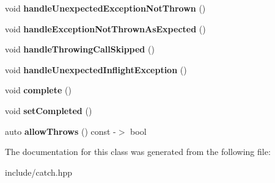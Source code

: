 \begin{DoxyCompactItemize}
\item 
void {\bfseries handle\+Unexpected\+Exception\+Not\+Thrown} ()\hypertarget{classCatch_1_1AssertionHandler_a7764d0adb6ed5eeb10964f6abc02fab1}{}\label{classCatch_1_1AssertionHandler_a7764d0adb6ed5eeb10964f6abc02fab1}

\item 
void {\bfseries handle\+Exception\+Not\+Thrown\+As\+Expected} ()\hypertarget{classCatch_1_1AssertionHandler_a51e4936e3af43b74690cedae6d2e297a}{}\label{classCatch_1_1AssertionHandler_a51e4936e3af43b74690cedae6d2e297a}

\item 
void {\bfseries handle\+Throwing\+Call\+Skipped} ()\hypertarget{classCatch_1_1AssertionHandler_a67a194d5518f307c4a16faa03a7f7442}{}\label{classCatch_1_1AssertionHandler_a67a194d5518f307c4a16faa03a7f7442}

\item 
void {\bfseries handle\+Unexpected\+Inflight\+Exception} ()\hypertarget{classCatch_1_1AssertionHandler_aa2504dad6a91f3645e5f52c932c11270}{}\label{classCatch_1_1AssertionHandler_aa2504dad6a91f3645e5f52c932c11270}

\item 
void {\bfseries complete} ()\hypertarget{classCatch_1_1AssertionHandler_a878a9eb828d8a1863c8dcb6575f6f40e}{}\label{classCatch_1_1AssertionHandler_a878a9eb828d8a1863c8dcb6575f6f40e}

\item 
void {\bfseries set\+Completed} ()\hypertarget{classCatch_1_1AssertionHandler_a6756bd5395c0ddd28764a9fb4612d5e4}{}\label{classCatch_1_1AssertionHandler_a6756bd5395c0ddd28764a9fb4612d5e4}

\item 
auto {\bfseries allow\+Throws} () const -\/$>$ bool\hypertarget{classCatch_1_1AssertionHandler_a193bb3999494c46457f3059184c6b251}{}\label{classCatch_1_1AssertionHandler_a193bb3999494c46457f3059184c6b251}

\end{DoxyCompactItemize}


The documentation for this class was generated from the following file\+:\begin{DoxyCompactItemize}
\item 
include/catch.\+hpp\end{DoxyCompactItemize}
